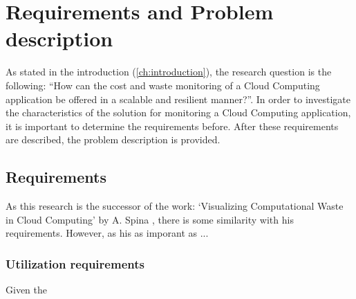 \chapter{Requirements and Problem description}\label{ch:requirements} %
As stated in the introduction (\autoref{ch:introduction}), the research question is the following: ``How can the cost and waste monitoring of a Cloud Computing application be offered in a scalable and resilient manner?''. In order to investigate the characteristics of the solution for monitoring a Cloud Computing application, it is important to determine the requirements before. After these requirements are described, the problem description is provided. 

\section{Requirements} \label{sec:requirements}
As this research is the successor of the work: `Visualizing Computational Waste in Cloud Computing' by A. Spina \cite{spina}, there is some similarity with his requirements. However, as his as imporant as ...


\subsection{Utilization requirements} \label{sec:utilization}
Given the 